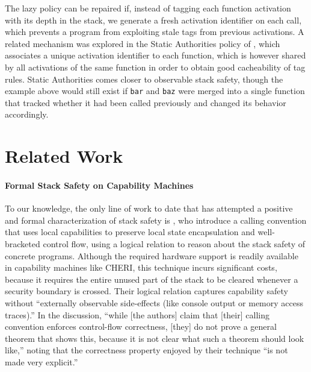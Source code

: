 \documentclass[acmsmall,review,anonymous]{acmart}\settopmatter{printfolios=true,printccs=false,printacmref=false}
\begin{document}
    The lazy policy can be repaired if, instead of tagging each function
    activation with its depth in the stack, we generate a fresh activation
    identifier on each call, which prevents a program from exploiting stale
    tags from previous activations. A related mechanism was explored in the
    Static Authorities policy of \citet{DBLP:conf/sp/RoesslerD18}, which
    associates a unique activation identifier to each function, which is
    however shared by all activations of the same function in order to obtain
    good cacheability of tag rules. Static Authorities comes closer to
    observable stack safety, though the example above would still exist
    if {\tt bar} and {\tt baz} were merged into a single function that tracked
    whether it had been called previously and changed its behavior accordingly.
    \ifaftersubmission{}\fi

\section{Related Work}
\label{sec:relwork}


\paragraph{Formal Stack Safety on Capability Machines}
%
To our knowledge, the only line of work to date that has attempted
a positive and formal characterization of
stack safety is \citet{Skorstengaard+19b}, who introduce a calling
convention that uses local capabilities to preserve local state
encapsulation and well-bracketed control flow, using a logical
relation to reason about the stack safety of concrete
programs. Although the required hardware support is readily available
in capability machines like CHERI, this technique incurs significant
costs, because it requires the entire unused part of the stack to be
cleared whenever a security boundary is crossed. Their logical
relation captures capability safety without ``externally observable
side-effects (like console output or memory access traces).'' In the
discussion, ``while [the authors] claim that [their] calling
convention enforces control-flow correctness, [they] do not prove a
general theorem that shows this, because it is not clear what such a
theorem should look like,'' noting that the correctness property
enjoyed by their technique ``is not made very explicit.''
\end{document}

